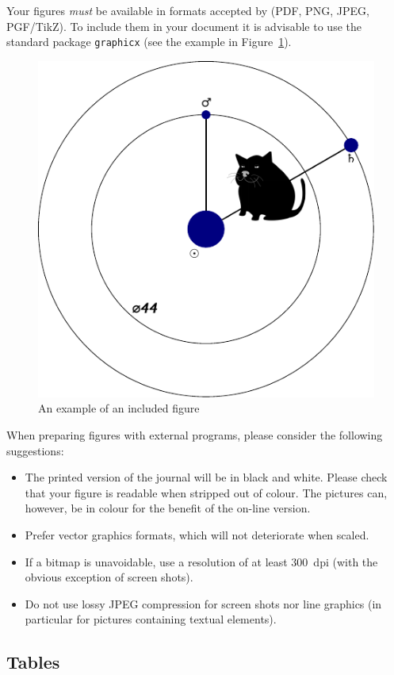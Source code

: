 \documentclass[
    anonymous,
]{jlm}
\begin{document}
Your figures \emph{must} be available in formats accepted by \XeLaTeX{}
(PDF, PNG, JPEG, PGF/TikZ). To include them in your document it is
advisable to use the standard package \texttt{graphicx} (see the
example in Figure~\ref{fig:ex}).
\begin{figure}
\includegraphics{jlm-example-fig1-k44}
\caption{An example of an included figure}
\label{fig:ex}
\end{figure}


When preparing figures with external programs, please consider the
following suggestions:
\begin{itemize}
\item The printed version of the journal will be in black and white.
  Please check that your figure is readable when stripped out of
  colour.  The pictures can, however, be in colour for the benefit of
  the on-line version.
\item Prefer vector graphics formats, which will not deteriorate when
  scaled.
\item If a bitmap is unavoidable, use a resolution of at least 300~dpi
  (with the obvious exception of screen shots).
\item Do not use lossy JPEG compression for screen shots nor line
  graphics (in particular for pictures containing textual elements).
\end{itemize}

\subsection{Tables}
\label{sec:tables}
\end{document}

